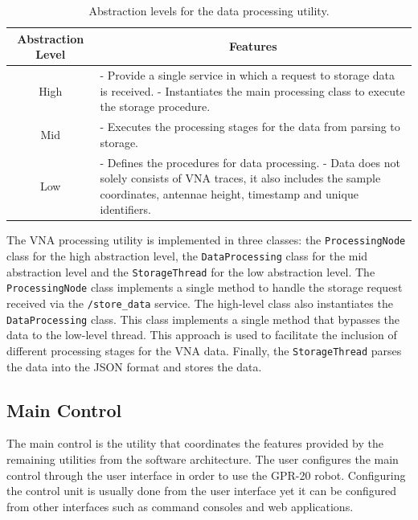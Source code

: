 \documentclass{article}
\begin{document}
\begin{table}[H]
    \centering
    \begin{tabular}{|c|p{10cm}|}
        \hline
        \textbf{Abstraction Level} & \multicolumn{1}{c|}{\textbf{Features}} \\ \hline
        High & - Provide a single service in which a request to storage data is received. \newline - Instantiates the main processing class to execute the storage procedure. \\ \hline
        Mid & - Executes the processing stages for the data from parsing to storage. \\ \hline
        Low & - Defines the procedures for data processing. \newline - Data does not solely consists of VNA traces, it also includes the sample coordinates, antennae height, timestamp and unique identifiers. \\ \hline
    \end{tabular}
    \caption{Abstraction levels for the data processing utility.}
    \label{tab:processing_abstraction}
\end{table}

The VNA processing utility is implemented in three classes: the \texttt{ProcessingNode} class for the high abstraction level, the \texttt{DataProcessing} class for the mid abstraction level and the \texttt{StorageThread} for the low abstraction level. The \texttt{ProcessingNode} class implements a single method to handle the storage request received via the \texttt{/store\_data} service. The high-level class also instantiates the \texttt{DataProcessing} class. This class implements a single method that bypasses the data to the low-level thread. This approach is used to facilitate the inclusion of different processing stages for the VNA data. Finally, the \texttt{StorageThread} parses the data into the JSON format and stores the data.  

\subsection{Main Control}
The main control is the utility that coordinates the features provided by the remaining utilities from the software architecture. The user configures the main control through the user interface in order to use the GPR-20 robot. Configuring the control unit is usually done from the user interface yet it can be configured from other interfaces such as command consoles and web applications. 
\end{document}
